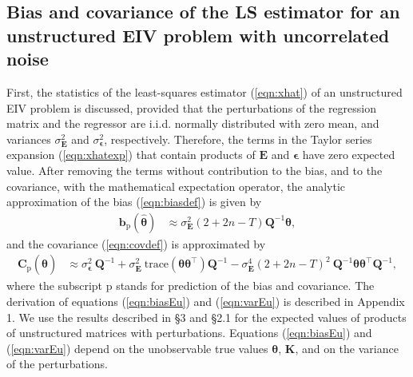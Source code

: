 \subsection{Bias and covariance of the LS estimator for an unstructured EIV problem with uncorrelated noise}

First, the statistics of the least-squares estimator (\ref{eqn:xhat}) of an unstructured EIV problem is discussed, 
provided that the perturbations of the regression matrix and the regressor are i.i.d. normally distributed with zero mean, and variances $\sigma_{\mathbf{E}}^2$ and $\sigma_{\bm{\epsilon}}^2$, respectively.
Therefore, the terms in the Taylor series expansion (\ref{eqn:xhatexp}) that contain products of $\mathbf{E}$ and $\bm{\epsilon}$ have zero expected value.
 After removing the terms without contribution to the bias, and to the covariance, with the mathematical expectation operator,
the analytic approximation of the bias (\ref{eqn:biasdef}) is given by 
\begin{equation} \begin{aligned} \mathbf{b}_{\mathrm{p}} \left( \widehat{\bm{\theta}} \right) & \approx \sigma_{\mathbf{E}}^2 \left( 2 + 2n - T \right) \mathbf{Q}^{-1} \bm{\theta} , \end{aligned} \label{eqn:biasEu} \end{equation}
and the covariance (\ref{eqn:covdef}) is approximated by 
\begin{equation} \begin{aligned} \mathbf{C}_{\mathrm{p}} \left( \widehat{\bm{\theta}} \right) & \approx \sigma_{\bm{\epsilon}}^2 \ \mathbf{Q}^{-1} + \sigma_{\mathbf{E}}^2 \ \mathrm{trace} \left( \bm{\theta} \bm{\theta}^\top \right) \mathbf{Q}^{-1} - \sigma_{\mathbf{E}}^4 \left( 2 + 2n - T \right)^2 \ \mathbf{Q}^{-1} \bm{\theta} \bm{\theta}^\top \mathbf{Q}^{-1} , \end{aligned} \label{eqn:varEu} \end{equation}
where the subscript $\mathrm{p}$ stands for prediction of the bias and covariance.
The derivation of equations (\ref{eqn:biasEu}) and (\ref{eqn:varEu}) is described in Appendix 1.
We use the results described in \citep{Vaccaro94} \S 3 and \citep{Stewart90SPT} \S 2.1 for the expected values of products of unstructured matrices with perturbations.
Equations (\ref{eqn:biasEu}) and (\ref{eqn:varEu}) depend on the unobservable true values $\bm{\theta}$, $\mathbf{K}$, and on the variance of the perturbations.
